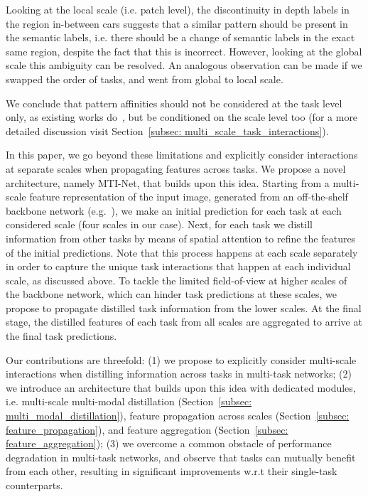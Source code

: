 \documentclass[runningheads]{llncs}
\begin{document}
Looking at the local scale (i.e. patch level), the discontinuity in depth labels in the region in-between cars suggests that a similar pattern should be present in the semantic labels, i.e. there should be a change of semantic labels in the exact same region, despite the fact that this is incorrect. However, looking at the global scale this ambiguity can be resolved. 
An analogous observation can be made if we swapped the order of tasks, and went from global to local scale. 

We conclude that pattern affinities should not be considered at the task level only, as existing works do~\cite{xu2018pad,zhang2018joint,zhang2019pattern}, but be conditioned on the scale level too (for a more detailed discussion visit Section~\ref{subsec: multi_scale_task_interactions}).

In this paper, we go beyond these limitations and explicitly consider interactions at separate scales when propagating features across tasks. We propose a novel architecture, namely MTI-Net, that builds upon this idea. Starting from a multi-scale feature representation of the input image, generated from an off-the-shelf backbone network (e.g.~\cite{lin2017feature,wang2019deep}), we make an initial prediction for each task at each considered scale (four scales in our case). Next, for each task we distill information from other tasks by means of spatial attention to refine the features of the initial predictions. Note that this process happens at each scale separately in order to capture the unique task interactions that happen at each individual scale, as discussed above. To tackle the limited field-of-view at higher scales of the backbone network, which can hinder task predictions at these scales, we propose to propagate distilled task information from the lower scales. At the final stage, the distilled features of each task from all scales are aggregated to arrive at the final task predictions. 

Our contributions are threefold:
(1) we propose to explicitly consider multi-scale interactions when distilling information across tasks in multi-task networks;
(2) we introduce an architecture that builds upon this idea with dedicated modules, i.e. multi-scale multi-modal distillation (Section~\ref{subsec: multi_modal_distillation}), feature propagation across scales (Section~\ref{subsec: feature_propagation}), and feature aggregation (Section~\ref{subsec: feature_aggregation});
(3) we overcome a common obstacle of performance degradation in multi-task networks, and observe that tasks can mutually benefit from each other, resulting in significant improvements w.r.t their single-task counterparts.
\end{document}
